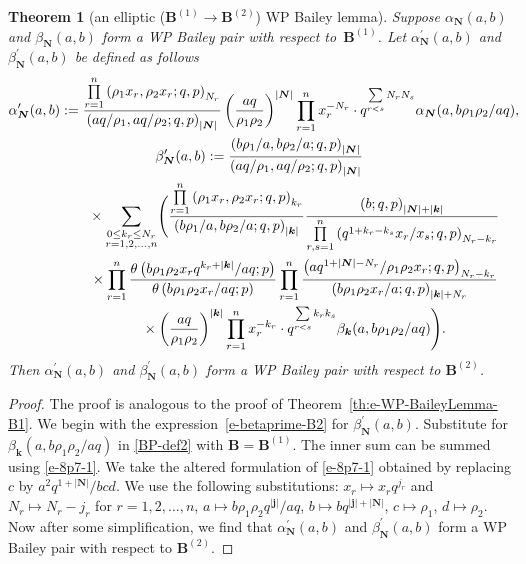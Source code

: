 \documentclass[pdftex]{sigma}
\numberwithin{equation}{section}
\newtheorem{Theorem}{Theorem}[section]
\newcommand{\sumN}{{\left| \boldsymbol{N} \right|}}
\newcommand\sumj{{\left| \boldsymbol {j} \right|}}
\newcommand\sumk{{\left| \boldsymbol{k} \right|}}
\newcommand{\B}{{ \mathbf B}}
\newcommand{\N}{{ \boldsymbol N}}
\renewcommand{\k}{{ \boldsymbol{k}}}
\newcommand{\multsum}[3]{{\sum\limits_{\substack{{0\le #1_#3 \le #2_#3} \\
{#3 =1,2,\dots, n}}}}}
\newcommand{\sqprod}[1]{\prod\limits_{r, s =1}^{#1}} %
\newcommand{\smallprod}[1]{\prod\limits_{r =1}^{#1}} %
\newcommand{\xover}[1]{#1_{r}/#1_{s}}
\newcommand{\ellipticqrfac}[2]{{\left({#1}; q, p\right)_{#2}}} %
\newcommand{\elliptictheta}[1]{\theta \left({#1} ; p\right) }
\begin{document}
\begin{Theorem}[an elliptic ($\B^{(1)} \to\B^{(2)}$) WP Bailey lemma] \label{th:e-WP-BaileyLemma-B1-B2}
Suppose $\alpha_\N(a,b)$ and $\beta_\N(a,b)$ form a WP Bailey pair with respect to~$\B^{(1)}$. Let ${\alpha}^{\prime}_\N(a,b)$ and ${\beta}^{\prime}_\N(a,b)$ be defined as follows
\begin{subequations}
\begin{gather}
{\alpha}^{\prime}_\N(a,b) :=
 \frac{ \smallprod n \ellipticqrfac{\rho_1x_r, \rho_2x_r}{N_r}}
{\ellipticqrfac{aq/\rho_1, aq/\rho_2}{\sumN}} \left(\frac{aq}{\rho_1\rho_2}\right)^{\sumN}
\smallprod n x_r^{-N_r}\cdot q^{\sum\limits_{r<s}N_r N_s} \alpha_\N(a, b\rho_1\rho_2/aq), \!\!\!\! \label{e-alphaprime-B2} \\
{\beta}^{\prime}_\N (a,b) :=
\frac{\ellipticqrfac{b\rho_1/a, b\rho_2/a }{\sumN}}{\ellipticqrfac{aq/\rho_1, aq/\rho_2}{\sumN}} \nonumber\\
\hphantom{{\beta}^{\prime}_\N (a,b) := }{}
 \times \multsum{k}{N}{r} \Bigg(
 \frac{ \smallprod n \ellipticqrfac{\rho_1x_r, \rho_2x_r}{k_r}}
{\ellipticqrfac{b\rho_1/a, b\rho_2/a}{\sumk}}
\frac{\ellipticqrfac{b}{\sumN+\sumk} }
{\sqprod n \ellipticqrfac{q^{1+k_r-k_s}\xover x }{N_r-k_r}}\nonumber\\
\hphantom{{\beta}^{\prime}_\N (a,b) := }{} \times
\smallprod n \frac{\elliptictheta{ b\rho_1\rho_2x_rq^{k_r+\sumk}/{aq}}}{\elliptictheta{ b\rho_1\rho_2x_r/{aq}}}
\smallprod n \frac{\ellipticqrfac{aq^{1+\sumN-N_r}/\rho_1\rho_2 x_r}{N_r-k_r}}{\ellipticqrfac{b\rho_1\rho_2x_r/a}{\sumk+N_r}} \notag\\
\hphantom{{\beta}^{\prime}_\N (a,b) := }{}
 \times \left(\frac{aq}{\rho_1\rho_2}\right)^{\sumk} \smallprod n x_r^{-k_r} \cdot q^{\sum\limits_{r<s} k_r k_s}
\beta_\k(a,b\rho_1\rho_2/aq) \Bigg).\label{e-betaprime-B2}
\end{gather}
\end{subequations}
Then ${\alpha}^{\prime}_\N(a,b)$ and ${\beta}^{\prime}_\N(a,b)$ form a WP Bailey pair with respect to $\B^{(2)}$.
\end{Theorem}

\begin{proof} The proof is analogous to the proof of Theorem~\ref{th:e-WP-BaileyLemma-B1}. We begin with the expres\-sion~\eqref{e-betaprime-B2} for $\beta_\N^{\prime}(a,b)$. Substitute for $\beta_\k(a,b\rho_1\rho_2/aq)$ in \eqref{BP-def2} with $\B=\B^{(1)}$. The inner sum can be summed using \eqref{e-8p7-1}. We take the altered formulation of \eqref{e-8p7-1} obtained by replacing $c$ by $a^2q^{1+\sumN}/bcd$. We use the following substitutions: $x_r\mapsto x_rq^{j_r}$ and $N_r\mapsto N_r-j_r$ for $r=1, 2, \dots, n$, $a\mapsto b\rho_1\rho_2q^{\sumj}/aq$, $b\mapsto bq^{\sumj+\sumN}$, $c\mapsto \rho_1$, $d\mapsto \rho_2$. Now after some simplification, we find that ${\alpha}^{\prime}_\N(a,b)$ and ${\beta}^{\prime}_\N(a,b)$ form a WP Bailey pair with respect to $\B^{(2)}$.
\end{proof}
\end{document}

